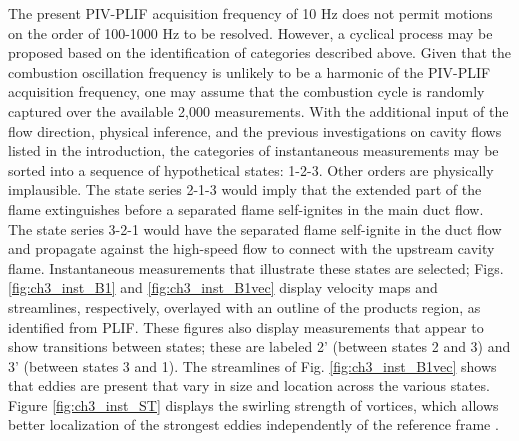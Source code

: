 The present PIV-PLIF acquisition frequency of 10 Hz does not permit motions on the order of 100-1000 Hz to be resolved. However, a cyclical process may be proposed based on the identification of categories described above. Given that the combustion oscillation frequency is unlikely to be a harmonic of the PIV-PLIF acquisition frequency, one may assume that the combustion cycle is randomly captured over the available 2,000 measurements. With the additional input of the flow direction, physical inference, and the previous investigations on cavity flows listed in the introduction, the categories of instantaneous measurements may be sorted into a sequence of hypothetical states: 1-2-3.  Other orders are physically implausible. The state series 2-1-3 would imply that the extended part of the flame extinguishes before a separated flame self-ignites in the main duct flow. The state series 3-2-1 would have the separated flame self-ignite in the duct flow and propagate against the high-speed flow to connect with the upstream cavity flame.  Instantaneous measurements that illustrate these states are selected; Figs. \ref{fig:ch3_inst_B1} and \ref{fig:ch3_inst_B1vec} display velocity maps and streamlines, respectively, overlayed with an outline of the products region, as identified from PLIF. These figures also display measurements that appear to show transitions between states; these are labeled 2' (between states 2 and 3) and 3' (between states 3 and 1).  The streamlines of Fig. \ref{fig:ch3_inst_B1vec} shows that eddies are present that vary in size and location across the various states.  Figure \ref{fig:ch3_inst_ST} displays the swirling strength of vortices, which allows better localization of the strongest eddies independently of the reference frame  \citep{Adrian2000}. 

